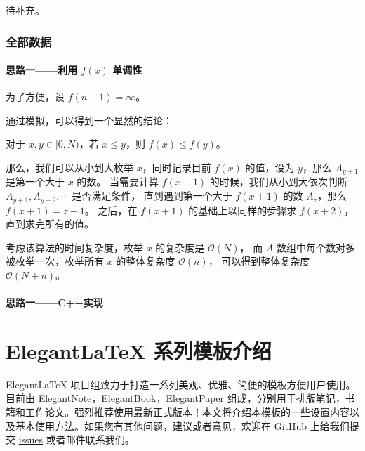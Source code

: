 \documentclass[cn,10pt,math=newtx,citestyle=gb7714-2015,bibstyle=gb7714-2015]{elegantbook}
\begin{document}
待补充。

\subsection{全部数据}

\subsubsection{思路一——利用 $f(x)$ 单调性}

为了方便，设 $f(n+1) = \infty$。

通过模拟，可以得到一个显然的结论：

\begin{theorem}[$f(x)$的单调性] \label{thm:fx_monotonicity} 
  对于 $x,y\in [0,N)$，若 $x \le y$，则 $f(x) \le f(y)$。
\end{theorem}

那么，我们可以从小到大枚举 $x$，同时记录目前 $f(x)$ 的值，设为 $y$，那么 $A_{y+1}$ 是第一个大于 $x$ 的数。
当需要计算 $f(x+1)$ 的时候，我们从小到大依次判断 $A_{y+1},A_{y+2},\cdots$ 是否满足条件，
直到遇到第一个大于 $f(x+1)$ 的数 $A_z$，那么 $f(x+1)=z-1$。
之后，在 $f(x+1)$ 的基础上以同样的步骤求 $f(x+2)$，直到求完所有的值。

考虑该算法的时间复杂度，枚举 $x$ 的复杂度是 $\mathcal{O}(N)$，
而 $A$ 数组中每个数对多被枚举一次，枚举所有 $x$ 的整体复杂度 $\mathcal{O}(n)$，
可以得到整体复杂度 $\mathcal{O}(N+n)$。

\subsubsection{思路一——C++实现}



\chapter{Elegant\LaTeX{} 系列模板介绍}

Elegant\LaTeX{} 项目组致力于打造一系列美观、优雅、简便的模板方便用户使用。目前由 \href{https://github.com/ElegantLaTeX/ElegantNote}{ElegantNote}，\href{https://github.com/ElegantLaTeX/ElegantBook}{ElegantBook}，\href{https://github.com/ElegantLaTeX/ElegantPaper}{ElegantPaper} 组成，分别用于排版笔记，书籍和工作论文。强烈推荐使用最新正式版本！本文将介绍本模板的一些设置内容以及基本使用方法。如果您有其他问题，建议或者意见，欢迎在 GitHub 上给我们提交 \href{https://github.com/ElegantLaTeX/ElegantBook/issues}{issues} 或者邮件联系我们。
\end{document}

